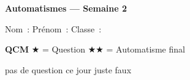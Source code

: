 \documentclass[10pt]{article}
\newcommand{\starQ}{\textcolor{questionC}{$\bigstar$}}
\newcommand{\starFF}{\textcolor{finalC}{$\bigstar\bigstar$}}
\newcommand{\okmark}{\ding{51}}
\newcommand{\nomark}{\ding{55}}
\begin{document}
\begin{center}
  {\large\bfseries Automatismes --- Semaine 2}
\end{center}

\vspace{4pt}
\noindent
Nom~: \hrulefill{} \hspace{14pt} Prénom~: \hrulefill{} \hspace{14pt} Classe~: \hrulefill

\vspace{4pt}
\footnotesize
\textcolor{qcmC}{\textbf{QCM}} \hspace{16pt}
\starQ{} = Question \hspace{16pt}
\starFF{} = Automatisme final \hspace{16pt}
\colorbox{emptyC}{\rule{0pt}{5pt}\hspace{10pt}} pas de question ce jour \hspace{16pt}
\textcolor{questionC}{\okmark} juste \textperiodcentered{} \textcolor{redC}{\nomark} faux
\end{document}

